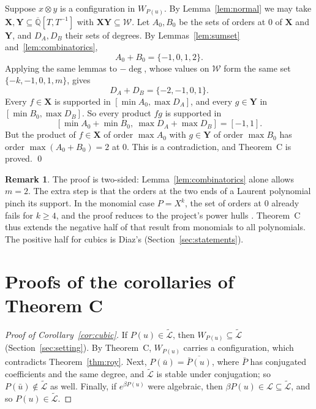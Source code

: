 \documentclass[11pt,a4paper]{article}
\theoremstyle{plain}
\theoremstyle{definition}
\newtheorem{remark}[theorem]{Remark}
\newcommand{\Qbar}{\overline{\mathbb{Q}}}
\newcommand{\cL}{\mathcal{L}}
\newcommand{\Lt}{\widetilde{\mathcal{L}}}
\begin{document}
Suppose $x\otimes y$ is a configuration in $W_{P(u)}$. By Lemma~\ref{lem:normal} we may
take $\mathbf X,\mathbf Y\subseteq\Qbar[T,T^{-1}]$ with $\mathbf X\mathbf Y\subseteq\mathcal W$.
Let $A_{0},B_{0}$ be the sets of orders at $0$ of $\mathbf X$ and $\mathbf Y$, and $D_{A},D_{B}$
their sets of degrees. By Lemmas~\ref{lem:sumset} and~\ref{lem:combinatorics},
\[
  A_{0}+B_{0}=\{-1,0,1,2\}.
\]
Applying the same lemmas to $-\deg$, whose values on $\mathcal W$ form the same set
$\{-k,-1,0,1,m\}$, gives
\[
  D_{A}+D_{B}=\{-2,-1,0,1\}.
\]
Every $f\in\mathbf X$ is supported in $[\min A_{0},\max D_{A}]$, and every $g\in\mathbf Y$ in
$[\min B_{0},\max D_{B}]$. So every product $fg$ is supported in
\[
  [\min A_{0}+\min B_{0},\ \max D_{A}+\max D_{B}]=[-1,1].
\]
But the product of $f\in\mathbf X$ of order $\max A_{0}$ with $g\in\mathbf Y$ of order $\max B_{0}$
has order $\max(A_{0}+B_{0})=2$ at $0$. This is a contradiction, and Theorem~C is proved.
\qed

\begin{remark}
The proof is two-sided: Lemma~\ref{lem:combinatorics} alone allows $m=2$. The extra
step is that the orders at the two ends of a Laurent polynomial pinch its support. In the
monomial case $P=X^{k}$, the set of orders at $0$ already fails for $k\ge4$, and the proof
reduces to the project's power hulls \cite[Thm.~10.14]{BP}. Theorem~C thus extends the
negative half of that result from monomials to all polynomials. The positive half for
cubics is Diaz's (Section~\ref{sec:statements}).
\end{remark}

\section{Proofs of the corollaries of Theorem C}\label{sec:cor}

\begin{proof}[Proof of Corollary~\ref{cor:cubic}]
If $P(u)\in\Lt$, then $W_{P(u)}\subseteq\Lt$ (Section~\ref{sec:setting}). By Theorem~C,
$W_{P(u)}$ carries a configuration, which contradicts Theorem~\ref{thm:roy}. Next,
$P(\bar u)=\overline{\bar P(u)}$, where $\bar P$ has conjugated coefficients and the same
degree, and $\Lt$ is stable under conjugation; so $P(\bar u)\notin\Lt$ as well. Finally,
if $e^{\beta P(u)}$ were algebraic, then $\beta P(u)\in\cL\subseteq\Lt$, and so
$P(u)\in\Lt$.
\end{proof}
\end{document}
